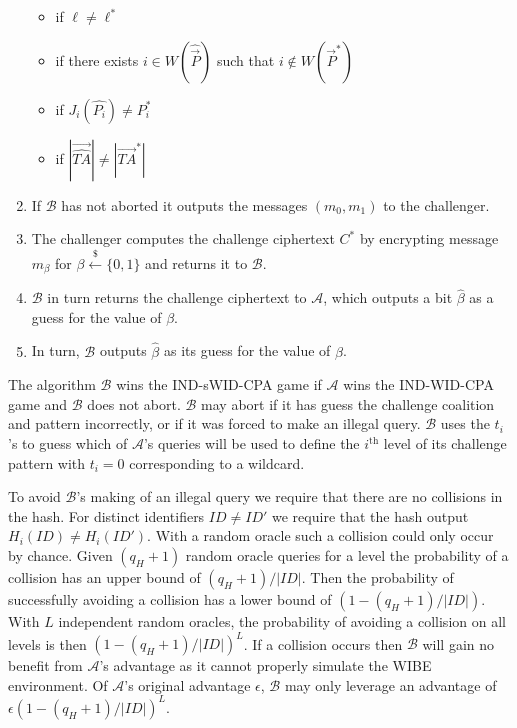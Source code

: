 \documentclass[10pt]{llncs}
\newcommand{\A}{\mathcal{A}}
\newcommand{\B}{\mathcal{B}}
\newcommand{\ID}{\mathit{ID}}
\newcommand{\TA}{\mathit{TA}}
\newcommand{\getsr}{\stackrel{{\scriptscriptstyle\$}}{\gets}}
\begin{document}
\begin{enumerate}
\begin{itemize}
			\item if $\ell \neq \ell^{*}$
			\item if there exists $i \in W(\widehat{\vec{P}})$ such that $i \notin W(\vec{P}^{*})$
			\item if $J_i(\widehat{P_i}) \neq P^{*}_i$
			\comment{\item if $J_1(\widehat{\TA_i}) \notin \vec{\TA}^{*}$}
			\item if $|\vec{\widehat{\TA}}| \neq |\vec{\TA}^{*}|$
		\end{itemize}
	\item If $\B$ has not aborted it outputs the messages $(m_0, m_1)$ to the challenger.
	\item The challenger computes the challenge ciphertext $C^{*}$ by encrypting message $m_\beta$ for $\beta \getsr \{0, 1\}$ and returns it to $\B$.
	\item $\B$ in turn returns the challenge ciphertext to $\A$, which outputs a bit $\widehat{\beta}$ as a guess for the value of $\beta$.
	\item In turn, $\B$ outputs $\widehat{\beta}$ as its guess for the value of $\beta$.
\end{enumerate}



The algorithm $\B$ wins the IND-sWID-CPA game if $\A$ wins the IND-WID-CPA game and $\B$ does not abort. $\B$ may abort if it has guess the challenge coalition and pattern incorrectly, or if it was forced to make an illegal query. $\B$ uses the $t_i$'s to guess which of $\A$'s queries will be used to define the $i^{\textrm{th}}$ level of its challenge pattern with $t_i =0$ corresponding to a wildcard.

To avoid $\B$'s making of an illegal query we require that there are no collisions in the hash. For distinct identifiers $\ID \ne \ID'$ we require that the hash output $H_i(\ID) \ne H_i(\ID')$. With a random oracle such a collision could only occur by chance. Given $(q_H + 1)$ random oracle queries for a level the probability of a collision has an upper bound of $(q_H + 1)/|\mathcal{\ID}|$. Then the probability of successfully avoiding a collision has a lower bound of $(1 - (q_H + 1)/|\mathcal{\ID}|)$. With $L$ independent random oracles, the probability of avoiding a collision on all levels is then $(1 - (q_H + 1)/|\mathcal{\ID}|)^L$. If a collision occurs then $\B$ will gain no benefit from $\A$'s advantage as it cannot properly simulate the WIBE environment. Of $\A$'s original advantage $\epsilon$, $\B$ may only leverage an advantage of $\epsilon(1 - (q_H + 1)/|\mathcal{\ID}|)^L$.
\end{document}
